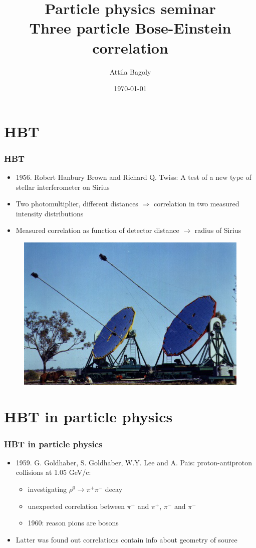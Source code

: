 \documentclass{beamer}
\title[HBT]{ Particle physics seminar \vspace{0.4cm}\\ Three particle Bose-Einstein correlation}
\author[Attila Bagoly]{\Large{Attila Bagoly}\\ \vspace{0.1cm}}
\date[\today]{\today}
\institute[ELTE]{
\large{Supervisor: Máté Csanád}
}
\begin{document}
\begin{frame}
  \titlepage
\end{frame}

\section{HBT}
\begin{frame}
\frametitle{HBT}
\begin{itemize}
\setlength{\itemsep}{8pt}
\item 1956. Robert Hanbury Brown and Richard Q. Twiss: A test of a new
type of stellar interferometer on Sirius
\item Two photomultiplier, different distances $\Rightarrow$ correlation in two measured intensity distributions
\item Measured correlation as function of detector distance $\rightarrow$ radius of Sirius
\end{itemize}
\begin{figure}
\includegraphics[scale=0.4]{pic/hbtdet.jpg}
\end{figure}
\end{frame}

\section{HBT in particle physics}
\begin{frame}
\frametitle{HBT in particle physics}
\begin{itemize}
\setlength{\itemsep}{14pt}
\item  1959. G. Goldhaber, S. Goldhaber, W.Y. Lee and A. Pais:
proton-antiproton collisions at 1.05 GeV/c:\vspace*{0.2cm}
\begin{itemize}
\setlength{\itemsep}{10pt}
\item investigating $\rho^0\rightarrow \pi^+\pi^-$ decay
\item unexpected correlation between $\pi^+$ and $\pi^+$, $\pi^-$ and $\pi^-$
\item 1960: reason pions are bosons
\end{itemize}
\item Latter was found out correlations contain info about geometry of source
\end{itemize}
\end{frame}
\end{document}
